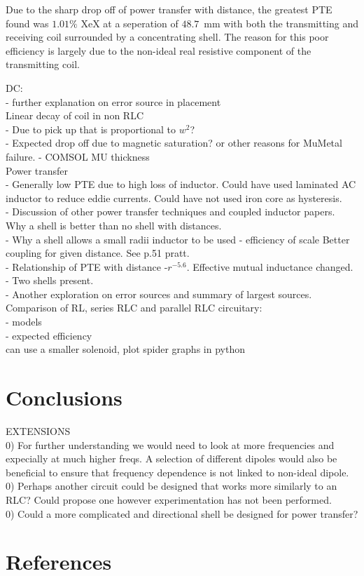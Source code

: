 \documentclass[11pt]{iopart}
\begin{document}
Due to the sharp drop off of power transfer with distance, the
greatest PTE found was $1.01\%$ XeX at a seperation of $48.7$~mm with
both the transmitting and receiving coil surrounded by a concentrating
shell. The reason for this poor efficiency is largely due to the
non-ideal real resistive component of the transmitting coil.


DC:  \\
- further explanation on error source in placement \\

Linear decay of coil in non RLC \\
- Due to pick up that is proportional to $w^2$? \\
- Expected drop off due to magnetic saturation? or other reasons for
MuMetal failure. - COMSOL MU thickness \\

Power transfer \\
- Generally low PTE due to high loss of inductor.  Could have used
laminated AC inductor to reduce eddie currents.  Could have not used
iron core as hysteresis. \\
- Discussion of other power transfer techniques and coupled inductor
papers. Why a shell is better than no shell with distances. \\
- Why a shell allows a small radii inductor to be used - efficiency of scale
Better coupling for given distance. See p.51 pratt. \\
- Relationship of PTE with distance -$r^{-5.6}$. Effective mutual
inductance changed. \\
- Two shells present. \\
- Another exploration on error sources and summary of largest
sources.\\

Comparison of RL, series RLC and parallel RLC circuitary: \\
- models \\
- expected efficiency \\


can use a smaller solenoid, plot spider graphs in python\\
\section{Conclusions}
EXTENSIONS \\
0) For further understanding we would need to look at more frequencies
and expecially at much higher freqs. A selection of different dipoles
would also be beneficial to ensure that frequency dependence is not
linked to non-ideal dipole.\\

0) Perhaps another circuit could be designed that works more similarly
to an RLC? Could propose one however experimentation has not been
performed.\\

0) Could a more complicated and directional shell be designed for
power transfer?\\
\section{References}
\end{document}
